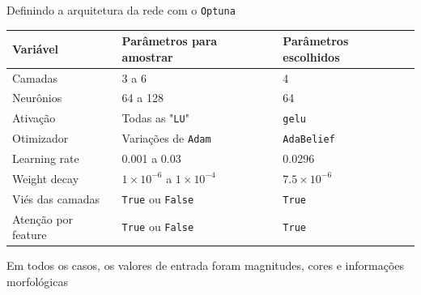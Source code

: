 \begin{frame}[c]{Definindo a arquitetura da rede com o \texttt{Optuna}}
    \begin{table}
        \centering
          \begin{tabular}{@{}lll@{}}
              \toprule
              \textbf{Variável}   & \textbf{Parâmetros para amostrar}     & \textbf{Parâmetros escolhidos} \\ \midrule
              Camadas             & 3 a 6                                 & 4                              \\
              Neurônios           & 64 a 128                              & 64                             \\
              Ativação            & Todas as "\texttt{LU}"                  & \texttt{gelu}                  \\
              Otimizador          & Variações de \texttt{Adam}            & \texttt{AdaBelief}             \\
              Learning rate       & 0.001 a 0.03                          & 0.0296                         \\
              Weight decay        & $1 \times 10^{-6}$ a $1 \times 10^{-4}$ & $7.5 \times 10^{-6}$           \\
              Viés das camadas    & \texttt{True} ou \texttt{False}       & \texttt{True}                  \\
              Atenção por feature & \texttt{True} ou \texttt{False}       & \texttt{True}                  \\ \bottomrule
          \end{tabular}
      \end{table}

      \begin{tcolorbox}
          Em todos os casos, os valores de entrada foram   magnitudes, cores e informações morfológicas
      \end{tcolorbox}
\end{frame}


